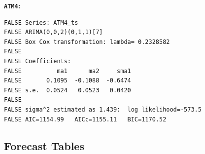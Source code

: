 \documentclass[openany]{book}
\begin{document}
\textbf{\texttt{ATM4}:}

\begin{verbatim}
FALSE Series: ATM4_ts 
FALSE ARIMA(0,0,2)(0,1,1)[7] 
FALSE Box Cox transformation: lambda= 0.2328582 
FALSE 
FALSE Coefficients:
FALSE          ma1      ma2     sma1
FALSE       0.1095  -0.1088  -0.6474
FALSE s.e.  0.0524   0.0523   0.0420
FALSE 
FALSE sigma^2 estimated as 1.439:  log likelihood=-573.5
FALSE AIC=1154.99   AICc=1155.11   BIC=1170.52
\end{verbatim}

\hypertarget{Part-A-FC}{%
\subsection*{Forecast Tables}\label{Part-A-FC}}
\end{document}
